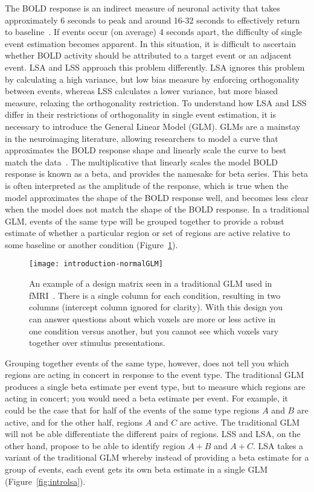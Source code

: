 \documentclass[phd,figures,tables,ackpage,abstractpage,publicabstractpage]{uithesis}
\begin{document}
The BOLD response is an indirect measure of neuronal activity that takes approximately 6 seconds to
peak and around 16-32 seconds to effectively return to baseline~\cite{Glover1999}.
If events occur (on average) 4 seconds apart, the difficulty of single event estimation
becomes apparent.
In this situation, it is difficult to ascertain whether BOLD activity should be attributed to a target event or an
adjacent event.
LSA and LSS approach this problem differently.
LSA ignores this problem by calculating a high variance, but low bias measure by enforcing orthogonality
between events,
whereas LSS calculates a lower variance, but more biased measure, relaxing the orthogonality restriction.
To understand how LSA and LSS differ in their restrictions of orthogonality in single event estimation,
it is necessary to introduce the General Linear Model (GLM).
GLMs are a mainstay in the neuroimaging literature, allowing researchers to model
a curve that approximates the BOLD response shape and linearly scale the curve
to best match the data~\cite{Friston1995a}.
The multiplicative that linearly scales the model BOLD response is known as a beta,
and provides the namesake for beta series.
This beta is often interpreted as the amplitude of the response, which is true when the
model approximates the shape of the BOLD response well, and becomes less clear when
the model does not match the shape of the BOLD response.
In a traditional GLM, events of the same type will be grouped together
to provide a robust estimate of whether a particular region or set of regions are
active relative to some baseline or another condition (Figure~\ref{fig:introGLM}).

\begin{figure}[H]
  \centering
  \texttt{[image: introduction-normalGLM]}
  \caption[Example GLM design matrix]{
    An example of a design matrix seen in a traditional GLM used in fMRI~\cite{Friston1995a}.
    There is a single column for each condition, resulting in two columns (intercept column ignored for clarity).
    With this design you can answer questions about which voxels are more or less active in one condition
    versus another, but you cannot see which voxels vary together over stimulus presentations.
  }
  \label{fig:introGLM}
\end{figure}

Grouping together events of the same type, however, does not tell you which regions are acting in concert
in response to the event type.
The traditional GLM produces a single beta estimate per event type, but to measure which regions
are acting in concert; you would need a beta estimate per event.
For example, it could be the case that for half of the events of the same type regions $A$ and $B$ are active,
and for the other half, regions $A$ and $C$ are active.
The traditional GLM will not be able differentiate the different pairs of regions.
LSS and LSA, on the other hand, propose to be able to identify region $A+B$ and $A+C$.
LSA takes a variant of the traditional GLM whereby instead of providing a beta
estimate for a group of events, each event gets its own beta estimate in a single GLM (Figure~\ref{fig:introlsa}).
\end{document}
